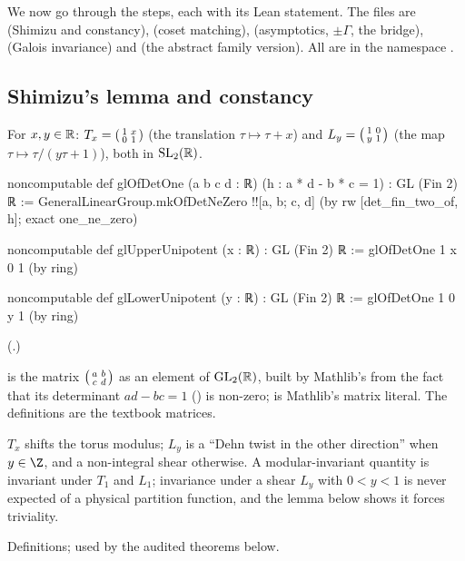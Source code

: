 We now go through the steps, each with its Lean statement.  The files are
 (Shimizu and constancy),
 (coset matching),
 (asymptotics, $\pm\Gamma$, the bridge),
 (Galois invariance) and
 (the abstract family version).  All are in the namespace
.

\subsection{Shimizu's lemma and constancy}

\begin{definition}\label{ch16:def:unipotent}
For $x,y\in\mathbb{R}$: $T_x=\left(\begin{smallmatrix}1&x\\0&1\end{smallmatrix}\right)$ (the translation $\tau\mapsto\tau+x$) and $L_y=\left(\begin{smallmatrix}1&0\\y&1\end{smallmatrix}\right)$ (the map
$\tau\mapsto\tau/(y\tau+1)$), both in $\mathrm{SL}_2(\mathbb{R})$.
\end{definition}
\begin{leancode}
noncomputable def glOfDetOne (a b c d : ℝ) (h : a * d - b * c = 1) : GL (Fin 2) ℝ :=
  GeneralLinearGroup.mkOfDetNeZero !![a, b; c, d] (by rw [det_fin_two_of, h]; exact one_ne_zero)

noncomputable def glUpperUnipotent (x : ℝ) : GL (Fin 2) ℝ := glOfDetOne 1 x 0 1 (by ring)

noncomputable def glLowerUnipotent (y : ℝ) : GL (Fin 2) ℝ := glOfDetOne 1 0 y 1 (by ring)
\end{leancode}
(.)
\begin{dictionary}
 is the matrix $\left(\begin{smallmatrix}a&b\\c&d\end{smallmatrix}\right)$ as an element of $\mathrm{GL}_2(\mathbb{R})$, built by Mathlib's
 from the fact that its determinant $ad-bc=1$ () is non-zero;
\lean{!![a, b; c, d]} is Mathlib's matrix literal.  The definitions are the textbook
matrices.
\end{dictionary}
\begin{physics}
$T_x$ shifts the torus modulus; $L_y$ is a ``Dehn twist in the other direction'' when $y\in\Z$, and a non-integral
shear otherwise.  A modular-invariant quantity is invariant under $T_1$ and $L_1$; invariance under a shear $L_y$
with $0<y<1$ is never expected of a physical partition function, and the lemma below shows it forces triviality.
\end{physics}
\begin{status}
Definitions; used by the audited theorems below.
\end{status}

